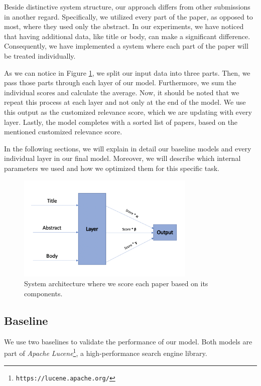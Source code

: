 \documentclass[10pt, a4paper]{article}
\begin{document}
	Beside distinctive system structure, our approach differs from other submissions in another regard. Specifically, we utilized every part of the paper, as opposed to most, where they used only the abstract. In our experiments, we have noticed that having additional data, like title or body, can make a significant difference. Consequently, we have implemented a system where each part of the paper will be treated individually. 
	
	As we can notice in Figure \ref{figure:approach}, we split our input data into three parts. Then, we pass those parts through each layer of our model. Furthermore, we sum the individual scores and calculate the average. Now, it should be noted that we repeat this process at each layer and not only at the end of the model. We use this output as the customized relevance score, which we are updating with every layer.  Lastly, the model completes with a sorted list of papers, based on the mentioned customized relevance score.
	
	In the following sections, we will explain in detail our baseline models and every individual layer in our final model. Moreover, we will describe which internal parameters we used and how we optimized them for this specific task.
	
	\begin{figure}[h]
		\centering
		\includegraphics[width=8.5cm]{approach}
		\caption{System architecture where we score each paper based on its components.  }
		\label{figure:approach}
	\end{figure}
	
	
	\subsection{Baseline}
	
	We use two baselines to validate the performance of our model. Both models are part of \emph{Apache Lucene}\footnote{\texttt{https://lucene.apache.org/}}, a high-performance search engine library.
	
\end{document}
